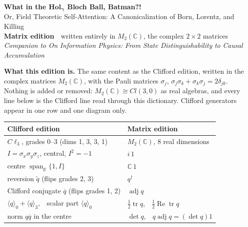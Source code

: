 \documentclass[10pt]{article}
\newcommand{\Cp}{\mathbb{C}}
\newcommand{\tr}{\operatorname{tr}}
\newcommand{\adj}{\operatorname{adj}}
\newcommand{\Mt}{M_2(\Cp)}
\begin{document}
\color{black}
\vspace{0pt}
\begin{center}
{\Large\textbf{What in the $\mathbf{Hol}_{\boldsymbol\gamma}$ Bloch Ball, Batman?!}}\\[3pt]
{\large Or, Field Theoretic Self-Attention: A Canonicalization of Born, Lorentz, and Killing}\\[3pt]
{\large\textbf{Matrix edition}}\ \ {\normalsize written entirely in $M_2(\Cp)$, the complex $2\times2$ matrices}\\[3pt]
\textit{Companion to On Information Physics: From State Distinguishability to Causal Accumulation}
\end{center}
\vspace{1pt}
\begin{sheetbox}
\textbf{What this edition is.} The same content as the Clifford edition, written in the complex matrices $\Mt$, with the Pauli matrices $\sigma_j$, $\sigma_j\sigma_k+\sigma_k\sigma_j=2\delta_{jk}$. Nothing is added or removed: $\Mt\cong Cl(3,0)$ as real algebras, and every line below is the Clifford line read through this dictionary. Clifford generators appear in one row and one diagram only.\par\vspace{3pt}
{\small\renewcommand{\arraystretch}{1.0}\setlength{\tabcolsep}{3pt}
\begin{minipage}[t]{0.5\linewidth}
\begin{tabular}[t]{@{}l l@{}}
\toprule
\textbf{Clifford edition} & \textbf{Matrix edition}\\
\midrule
$C\ell_3$, grades 0--3 (dims 1, 3, 3, 1) & $\Mt$, 8 real dimensions\\
$I=\sigma_x\sigma_y\sigma_z$, central, $I^2=-1$ & $i\,1$\\
centre $\operatorname{span}_{\mathbb R}\{1,I\}$ & $\Cp\,1$\\
reversion $\widetilde q$ (flips grades 2, 3) & $q^\dagger$\\
Clifford conjugate $\overline q$ (flips grades 1, 2) & $\adj q$\\
$\langle q\rangle_0+\langle q\rangle_3$,\ \ scalar part $\langle q\rangle_0$ & $\tfrac12\tr q$,\ \ $\tfrac12\operatorname{Re}\tr q$\\
norm $q\overline q$ in the centre & $\det q$,\ \ $q\adj q=(\det q)1$\\
\bottomrule
\end{tabular}
\end{minipage}\hfill
}
\end{sheetbox}
\end{document}
